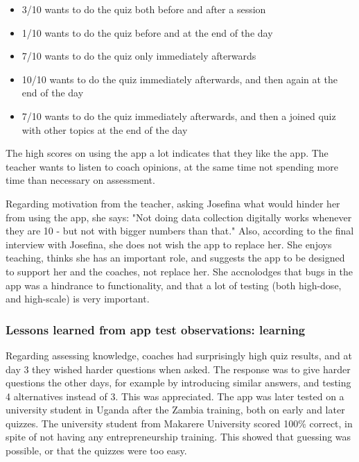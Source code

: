 


    \begin{itemize}
    \item 3/10 wants to do the quiz both before and after a session
    \item 1/10 wants to do the quiz before and at the end of the day
    \item 7/10 wants to do the quiz only immediately afterwards
    \item 10/10 wants to do the quiz immediately afterwards, and then again at the end of the day
    \item 7/10 wants to do the quiz immediately afterwards, and then a joined quiz with other topics at the end of the day
    \end{itemize}

    The high scores on using the app a lot indicates that they like the app. The teacher wants to listen to coach opinions, at the same time not spending more time than necessary on assessment.

Regarding motivation from the teacher, asking Josefina what would hinder her from using the app, she says: "Not doing data collection digitally works whenever they are 10 - but not with bigger numbers than that." Also, according to the final interview with Josefina, she does not wish the app to replace her. She enjoys teaching, thinks she has an important role, and suggests the app to be designed to support her and the coaches, not replace her. She accnolodges that bugs in the app was a hindrance to functionality, and that a lot of testing (both high-dose, and high-scale) is very important.

\subsubsection{Lessons learned from app test observations: learning}
Regarding assessing knowledge, coaches had surprisingly high quiz results, and at day 3 they wished harder questions when asked. The response was to give harder questions the other days, for example by introducing similar answers, and testing 4 alternatives instead of 3. This was appreciated. The app was later tested on a university student in Uganda after the Zambia training, both on early and later quizzes. The university student from Makarere University scored 100\% correct, in spite of not having any entrepreneurship training. This showed that guessing was possible, or that the quizzes were too easy.

